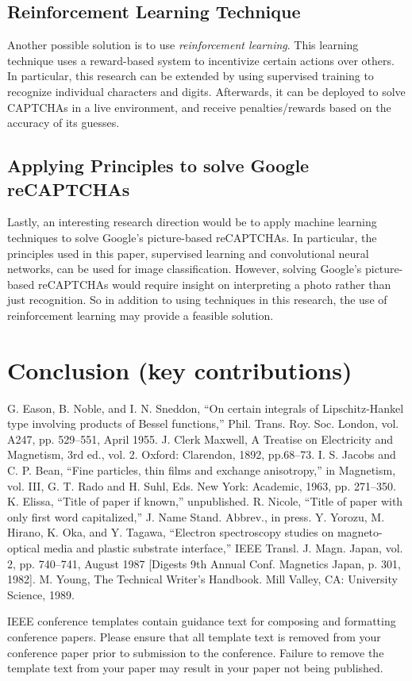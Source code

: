 \documentclass[11pt,conference]{IEEEtran}
\begin{document}
\subsection{Reinforcement Learning Technique}
Another possible solution is to use \emph{reinforcement learning}. This learning technique uses a reward-based
system to incentivize certain actions over others. In particular, this research
can be extended by using supervised training to recognize individual
characters and digits. Afterwards, it can be deployed to solve CAPTCHAs in a
live environment, and receive penalties/rewards based on the accuracy of its
guesses.

\subsection{Applying Principles to solve Google reCAPTCHAs}
Lastly, an interesting research direction would be to apply machine learning
techniques to solve Google's picture-based reCAPTCHAs. In particular, the
principles used in this paper, supervised learning and convolutional neural
networks, can be used for image classification. However, solving Google's picture-based
reCAPTCHAs would require insight on interpreting a photo
rather than just recognition. So in addition to using techniques in this
research, the use of reinforcement learning may provide a feasible solution.


\section{Conclusion (key contributions)}


\begin{thebibliography}{00}
	 G. Eason, B. Noble, and I. N. Sneddon, ``On certain integrals of Lipschitz-Hankel type involving products of Bessel functions,'' Phil. Trans. Roy. Soc. London, vol. A247, pp. 529--551, April 1955.
	 J. Clerk Maxwell, A Treatise on Electricity and Magnetism, 3rd ed., vol. 2. Oxford: Clarendon, 1892, pp.68--73.
	 I. S. Jacobs and C. P. Bean, ``Fine particles, thin films and exchange anisotropy,'' in Magnetism, vol. III, G. T. Rado and H. Suhl, Eds. New York: Academic, 1963, pp. 271--350.
	 K. Elissa, ``Title of paper if known,'' unpublished.
	 R. Nicole, ``Title of paper with only first word capitalized,'' J. Name Stand. Abbrev., in press.
	 Y. Yorozu, M. Hirano, K. Oka, and Y. Tagawa, ``Electron spectroscopy studies on magneto-optical media and plastic substrate interface,'' IEEE Transl. J. Magn. Japan, vol. 2, pp. 740--741, August 1987 [Digests 9th Annual Conf. Magnetics Japan, p. 301, 1982].
	 M. Young, The Technical Writer's Handbook. Mill Valley, CA: University Science, 1989.
\end{thebibliography}
\vspace{12pt}
\color{red}
IEEE conference templates contain guidance text for composing and formatting conference papers. Please ensure that all template text is removed from your conference paper prior to submission to the conference. Failure to remove the template text from your paper may result in your paper not being published.
\end{document}
